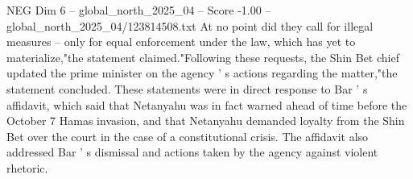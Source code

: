 \begin{textsample}{NEG Dim 6 – global\_north\_2025\_04 – Score -1.00 – global\_north\_2025\_04/123814508.txt}
At no point did they call for illegal measures -- only for equal enforcement under the law, which has yet to materialize,"the statement claimed."Following these requests, the Shin Bet chief updated the prime minister on the agency ' s actions regarding the matter,"the statement concluded.
These statements were in direct response to Bar ' s affidavit, which said that Netanyahu was in fact warned ahead of time before the October 7 Hamas invasion, and that Netanyahu demanded loyalty from the Shin Bet over the court in the case of a constitutional crisis.
The affidavit also addressed Bar ' s dismissal and actions taken by the agency against violent rhetoric.

\end{textsample}
